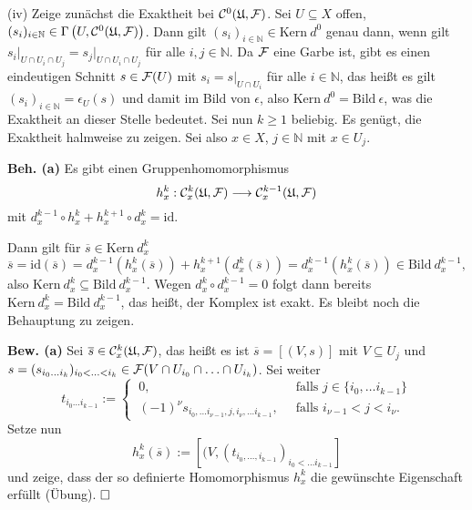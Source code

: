 \documentclass[11pt]{book}
\theoremstyle{nonumberbreak}
\newenvironment{pr}[1][]{\ifthenelse{\equal{#1}{}}{\proof}{\proof[#1]}\rm}{\endproof}
\newenvironment{definprop}[1][]{\ifthenelse{\equal{#1}{}}{\definiprop}{\definiprop[#1]}\rm}{\enddefiniprop}
\newcommand{\bild}{\mathrm{Bild}\ }
\newcommand{\kernel}{\mathrm{Kern}\ }
\begin{document}
\begin{spacing}{1.4}
\begin{definprop}
\begin{pr}
\begin{compactenum}
\item[(iv)] Zeige zunächst die Exaktheit bei $\mathcal{C}^{0}(\mathfrak{U}, \mathcal{F})$. Sei $U \subseteq X$ offen, $(s_i)_{i \in \mathbb{N}} \in \Gamma\left(U,\mathcal{C}^{0}(\mathfrak{U}, \mathcal{F})\right)$. Dann gilt $(s_i)_{i \in \mathbb{N}} \in \kernel d^{0}$ genau dann, wenn gilt $s_i \vert_{U \cap U_i \cap U_j} = s_j\vert_{U \cap U_i \cap U_j}$ für alle $i,j \in \mathbb{N}$. Da $\mathcal{F}$ eine Garbe ist, gibt es einen eindeutigen Schnitt $s \in \mathcal{F}(U)$ mit $s_i = s\vert_{U \cap U_i}$ für alle $i \in \mathbb{N}$, das heißt es gilt $(s_i)_{i \in \mathbb{N}} = \epsilon_U(s)$ und damit im Bild von $\epsilon$, also $\kernel d^{0} = \bild \epsilon$, was die Exaktheit an dieser Stelle bedeutet.
Sei nun $k \geqslant 1$ beliebig. Es genügt, die Exaktheit halmweise zu zeigen. Sei also $x \in X$, $j \in \mathbb{N}$ mit $x \in U_j$.
\begin{compactenum}
\item[\textbf{Beh. (a)}] Es gibt einen Gruppenhomomorphismus 
$$h_x^{k}: \mathcal{C}^{k}_x(\mathfrak{U}, \mathcal{F}) \longrightarrow \mathcal{C}^{k-1}_x(\mathfrak{U}, \mathcal{F})$$
mit $d_x^{k-1} \circ h_x^{k} + h_x^{k+1} \circ d_x^{k} = \mathrm{id}$.
\end{compactenum}
Dann gilt für $\overline{s} \in \kernel d_x^{k}$
$$\overline{s} = \mathrm{id}(\overline{s}) = d_x^{k-1}(h_x^{k}(\overline{s})) + h_x^{k+1}(d_x^{k}(\overline{s})) = d_x^{k-1}(h_x^{k}(\overline{s})) \in \bild d_x^{k-1},$$
also $\kernel d_x^{k} \subseteq \bild d_x^{k-1}$. Wegen $d_x^{k} \circ d_x^{k-1} =0$ folgt dann bereits $\kernel d_x^{k} = \bild d_x^{k-1}$, das heißt, der Komplex ist exakt. Es bleibt noch die Behauptung zu zeigen.
\begin{compactenum}
\item[\textbf{Bew. (a)}] Sei $\overline{s} \in \mathcal{C}^{k}_x(\mathfrak{U}, \mathcal{F})$, das heißt es ist $\overline{s} = [(V,s)]$ mit $V \subseteq U_j$ und $s=(s_{{i_0} \ldots {i_k}})_{i_0 < \ldots <i_k} \in \mathcal{F}(V \cap U_{i_0} \cap \ldots \cap U_{i_k})$. Sei weiter
$$t_{i_0 \ldots i_{k-1}} := \begin{cases} \ 0, & \ \textrm{ falls } j \in \{i_0, \ldots i_{k-1}\} \\ \ (-1)^{\nu} s_{i_0, \ldots i_{\nu-1}, j, i_{\nu}, \ldots i_{k-1}}, & \ \textrm{ falls } i_{\nu-1} < j < i_{\nu}. \end{cases}$$
Setze nun 
$$h_x^{k}(\overline{s}) := \left[(V, (t_{i_0, \ldots, i_{k-1}})_{i_0 < \ldots i_{k-1}}\right]$$
und zeige, dass der so definierte Homomorphismus $h_x^{k}$ die gewünschte Eigenschaft erfüllt (Übung). $\hfill \Box$
\end{compactenum}


\end{compactenum}
\end{pr}
\end{definprop}
\end{spacing}
\end{document}
